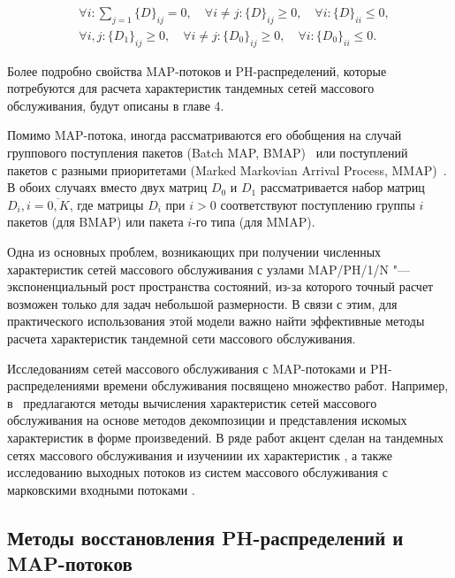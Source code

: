 \begin{equation}\label{eq:ch1_map_def}
  \begin{aligned}
    &\forall i: \sum\limits_{j=1} \{D\}_{ij} = 0, \quad
      \forall i \neq j: \{D\}_{ij} \geq 0, \quad
      \forall i: \{D\}_{ii} \leq 0,\\
    &\forall i, j: \{D_{1}\}_{ij} \geq 0,\quad
      \forall i \neq j: \{D_{0}\}_{ij} \geq 0, \quad
      \forall i: \{D_{0}\}_{ii} \leq 0.
  \end{aligned}
\end{equation}

Более подробно свойства MAP-потоков и PH-распределений, которые потребуются для расчета характеристик тандемных сетей массового обслуживания, будут описаны в главе 4.

Помимо MAP-потока, иногда рассматриваются его обобщения на случай группового поступления пакетов (Batch MAP, BMAP)~\cite{Lucantoni1993, Dudin2000, VishnevskyDudin2018} или поступлений пакетов с разными приоритетами (Marked Markovian Arrival Process, MMAP)~\cite{HE2001, VanHoudt2012, Buchholz2010, Klimenok2020}. В обоих случаях вместо двух матриц $D_0$ и $D_1$ рассматривается набор матриц $D_i, i = \overline{0,K}$, где матрицы $D_i$ при $i > 0$ соответствуют поступлению группы $i$ пакетов (для BMAP) или пакета $i$-го типа (для MMAP).

Одна из основных проблем, возникающих при получении численных характеристик сетей массового обслуживания с узлами MAP/PH/1/N "--- экспоненциальный рост пространства состояний, из-за которого точный расчет возможен только для задач небольшой размерности. В связи с этим, для практического использования этой модели важно найти эффективные методы расчета характеристик тандемной сети массового обслуживания.

Исследованиям сетей массового обслуживания с MAP-потоками и PH-распределениями времени обслуживания посвящено множество работ. Например, в~\cite{Strelen1998, Henderson1990, Strelen1997, Strelen1997a} предлагаются методы вычисления характеристик сетей массового обслуживания на основе методов декомпозиции и представления искомых характеристик в форме произведений. В ряде работ акцент сделан на тандемных сетях массового обслуживания и изучениии их характеристик \cite{Kim2018, Kim2012, Kim2007, Buchholz2006}, а также исследованию выходных потоков из систем массового обслуживания с марковскими входными потоками \cite{Bean1998, Lian2011}.

\subsection{Методы восстановления PH-распределений и MAP-потоков}\label{sec:ch1_qs_ph_fitting}

